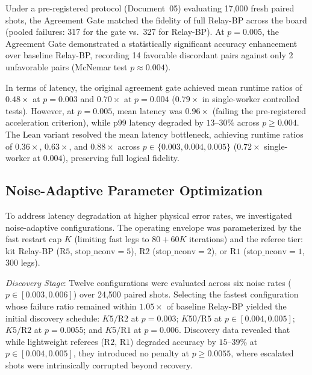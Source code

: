 Under a pre-registered protocol (Document~05) evaluating 17,000 fresh paired shots, the Agreement Gate matched the fidelity of full Relay-BP across the board (pooled failures: 317 for the gate vs.\ 327 for Relay-BP). At $p = 0.005$, the Agreement Gate demonstrated a statistically significant accuracy enhancement over baseline Relay-BP, recording 14 favorable discordant pairs against only 2 unfavorable pairs (McNemar test $p \approx 0.004$).

In terms of latency, the original agreement gate achieved mean runtime ratios of $0.48\times$ at $p = 0.003$ and $0.70\times$ at $p = 0.004$ ($0.79\times$ in single-worker controlled tests). However, at $p = 0.005$, mean latency was $0.96\times$ (failing the pre-registered acceleration criterion), while p99 latency degraded by $13\text{--}30\%$ across $p \ge 0.004$. The Lean variant resolved the mean latency bottleneck, achieving runtime ratios of $0.36\times$, $0.63\times$, and $0.88\times$ across $p \in \{0.003, 0.004, 0.005\}$ ($0.72\times$ single-worker at $0.004$), preserving full logical fidelity.

\subsection{Noise-Adaptive Parameter Optimization}

To address latency degradation at higher physical error rates, we investigated noise-adaptive configurations. The operating envelope was parameterized by the fast restart cap $K$ (limiting fast legs to $80 + 60K$ iterations) and the referee tier: kit Relay-BP ($\text{R5}$, $\text{stop\_nconv} = 5$), $\text{R2}$ ($\text{stop\_nconv} = 2$), or $\text{R1}$ ($\text{stop\_nconv} = 1$, 300 legs).

\textit{Discovery Stage}: Twelve configurations were evaluated across six noise rates ($p \in [0.003, 0.006]$) over 24,500 paired shots. Selecting the fastest configuration whose failure ratio remained within $1.05\times$ of baseline Relay-BP yielded the initial discovery schedule: $K5/\text{R2}$ at $p = 0.003$; $K50/\text{R5}$ at $p \in [0.004, 0.005]$; $K5/\text{R2}$ at $p = 0.0055$; and $K5/\text{R1}$ at $p = 0.006$. Discovery data revealed that while lightweight referees ($\text{R2}$, $\text{R1}$) degraded accuracy by $15\text{--}39\%$ at $p \in [0.004, 0.005]$, they introduced no penalty at $p \ge 0.0055$, where escalated shots were intrinsically corrupted beyond recovery.

